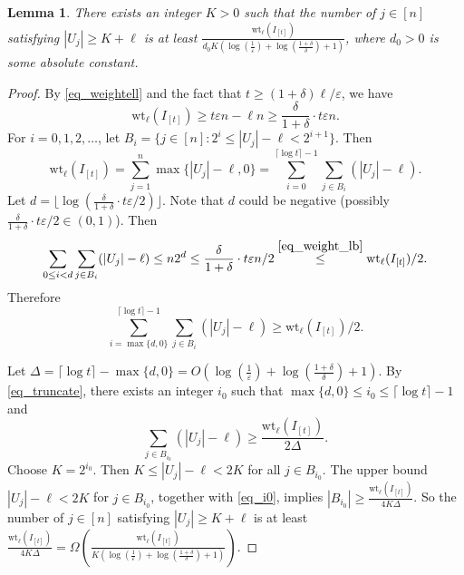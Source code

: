 \documentclass[11pt]{article}
\newtheorem{lemma}[theorem]{Lemma}
\renewcommand{\epsilon}{\varepsilon}
\begin{document}
\begin{lemma}\label{lem_card}
There exists an integer $K>0$ such that
 the number of $j\in [n]$ satisfying $|U_j|\geq K+\ell$
  is at least $\frac{\mathrm{wt}_\ell(I_{[t]})}{d_0 K (\log(\frac{1}{\epsilon})+\log( \frac{1+\delta}{\delta })+1)}$,
 where $d_0>0$ is some absolute constant.
\end{lemma}
\begin{proof}
By \eqref{eq_weightell} and the fact that $t\geq (1+\delta)\ell /\epsilon$,  we have
\begin{equation}\label{eq_weight_lb}
\mathrm{wt}_\ell(I_{[t]})\geq t \epsilon n-\ell n\geq \frac{\delta}{1+\delta} \cdot t\epsilon n.
\end{equation}
For $i=0,1,2,\dots$, let $B_i=\{j\in [n]: 2^i\leq |U_j|-\ell <2^{i+1}\}$.
Then
\[
\mathrm{wt}_\ell(I_{[t]})=\sum_{j=1}^n \max\{|U_j|-\ell, 0\}=\sum_{i=0}^{\lceil\log t\rceil-1} \sum_{j\in B_i}  (|U_j|-\ell).
\]
Let $d=\lfloor \log ( \frac{\delta}{1+\delta} \cdot t\epsilon/2) \rfloor$. Note that $d$ could be negative (possibly $\frac{\delta}{1+\delta} \cdot t\epsilon/2\in(0,1)$).
Then
\[
\sum_{0\leq i<d} \sum_{j\in B_i}  (|U_j|-\ell)\leq n 2^d \leq  \frac{\delta}{1+\delta} \cdot t\epsilon n/2  \stackrel{\eqref{eq_weight_lb}}{\leq} \mathrm{wt}_\ell(I_{[t]})/2.
\]
Therefore
\begin{equation}\label{eq_truncate}
\sum_{i=\max\{d,0\}}^{\lceil\log t\rceil-1} \sum_{j\in B_i} (|U_j|-\ell) \geq \mathrm{wt}_\ell(I_{[t]})/2.
\end{equation}


Let $\Delta=\lceil\log t\rceil-\max\{d,0\}= O(\log(\frac{1}{\epsilon})+\log( \frac{1+\delta}{\delta })+1)$.
By \eqref{eq_truncate}, there exists an integer $i_0$ such that $\max\{d,0\}\leq i_0\leq \lceil\log t\rceil-1$ and
\begin{equation}\label{eq_i0}
 \sum_{j\in B_{i_0}}  (|U_j|-\ell)\geq \frac{\mathrm{wt}_\ell(I_{[t]})}{2\Delta}.
\end{equation}
  Choose $K=2^{i_0}$. Then $K\leq |U_j|-\ell<2K$ for all $j\in B_{i_0}$.
The upper bound $  |U_j|-\ell <2K$  for  $j\in B_{i_0}$, together with \eqref{eq_i0},    implies $|B_{i_0}|\geq  \frac{\mathrm{wt}_\ell(I_{[t]})}{4K \Delta}$.
So the number of $j\in [n]$ satisfying  $|U_j|\geq K+\ell$ is at least $\frac{\mathrm{wt}_\ell(I_{[t]})}{4K\Delta}=\Omega\left(\frac{\mathrm{wt}_\ell(I_{[t]})}{K(\log(\frac{1}{\epsilon})+\log( \frac{1+\delta}{\delta })+1)}\right)$.
\end{proof}
\end{document}
